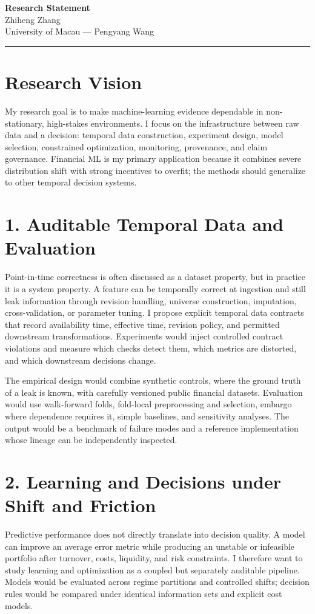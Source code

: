 \documentclass[11pt]{article}
\newcommand{\ApplicantName}{Zhiheng Zhang}
\begin{document}
\begin{center}
{\LARGE\bfseries Research Statement}\\[0.25em]
{\large \ApplicantName}\\
University of Macau --- Pengyang Wang
\end{center}
\vspace{0.35em}\hrule\vspace{0.65em}

\section*{Research Vision}
My research goal is to make machine-learning evidence dependable in non-stationary, high-stakes environments. I focus on the infrastructure between raw data and a decision: temporal data construction, experiment design, model selection, constrained optimization, monitoring, provenance, and claim governance. Financial ML is my primary application because it combines severe distribution shift with strong incentives to overfit; the methods should generalize to other temporal decision systems.

\section*{1. Auditable Temporal Data and Evaluation}
Point-in-time correctness is often discussed as a dataset property, but in practice it is a system property. A feature can be temporally correct at ingestion and still leak information through revision handling, universe construction, imputation, cross-validation, or parameter tuning. I propose explicit temporal data contracts that record availability time, effective time, revision policy, and permitted downstream transformations. Experiments would inject controlled contract violations and measure which checks detect them, which metrics are distorted, and which downstream decisions change.

The empirical design would combine synthetic controls, where the ground truth of a leak is known, with carefully versioned public financial datasets. Evaluation would use walk-forward folds, fold-local preprocessing and selection, embargo where dependence requires it, simple baselines, and sensitivity analyses. The output would be a benchmark of failure modes and a reference implementation whose lineage can be independently inspected.

\section*{2. Learning and Decisions under Shift and Friction}
Predictive performance does not directly translate into decision quality. A model can improve an average error metric while producing an unstable or infeasible portfolio after turnover, costs, liquidity, and risk constraints. I therefore want to study learning and optimization as a coupled but separately auditable pipeline. Models would be evaluated across regime partitions and controlled shifts; decision rules would be compared under identical information sets and explicit cost models.
\end{document}
